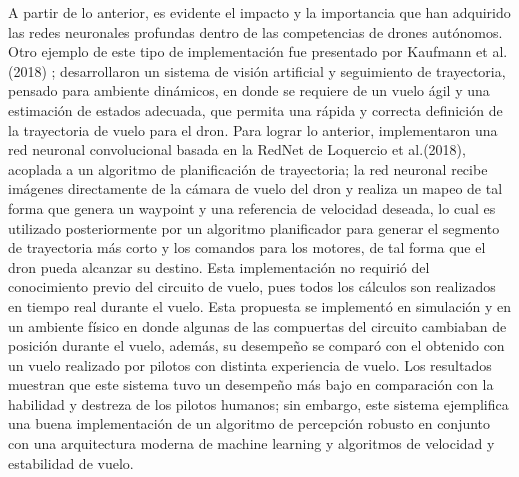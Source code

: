 A partir de lo anterior, es evidente el impacto y la importancia que han adquirido las redes neuronales profundas dentro de las competencias de drones autónomos. Otro ejemplo de este tipo de implementación fue presentado por Kaufmann et al. (2018) \citet{kaufmann2018deep};  desarrollaron un sistema de visión artificial y seguimiento de trayectoria, pensado para ambiente dinámicos, en donde se requiere de un vuelo ágil y una estimación de estados adecuada, que permita una rápida y correcta definición de la trayectoria de vuelo para el dron. 
Para lograr lo anterior, implementaron una red neuronal convolucional basada en la RedNet de Loquercio et al.(2018)\citet{loquercio2018dronet}, acoplada a un algoritmo de planificación de trayectoria; la red neuronal recibe imágenes directamente de la cámara de vuelo del dron y realiza un mapeo de tal forma que genera un waypoint y una referencia de velocidad deseada, lo cual es utilizado posteriormente por un algoritmo planificador para generar el segmento de trayectoria más corto y los comandos para los motores, de tal forma que el dron pueda alcanzar su destino. Esta implementación no requirió del conocimiento previo del circuito de vuelo, pues todos los cálculos son realizados en tiempo real durante el vuelo. Esta propuesta se implementó en simulación y en un ambiente físico en donde algunas de las compuertas del circuito cambiaban de posición durante el vuelo, además, su desempeño se comparó con el obtenido con un vuelo realizado por pilotos con distinta experiencia de vuelo. Los resultados muestran que este sistema tuvo un desempeño más bajo en comparación con la habilidad y destreza de los pilotos humanos; sin embargo, este sistema ejemplifica una buena implementación de un algoritmo de percepción robusto en conjunto con una arquitectura moderna de machine learning y algoritmos de velocidad y estabilidad de vuelo. 

